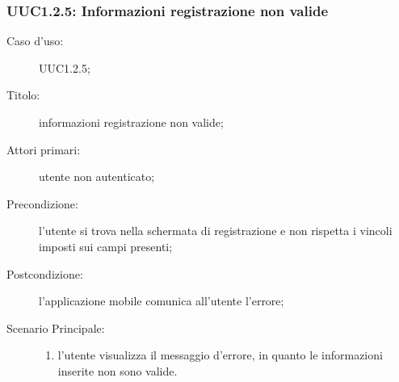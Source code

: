 \documentclass[../../../analisi-dei-requisiti.tex]{subfiles}
\begin{document}
\subsubsection{UUC1.2.5: Informazioni registrazione non valide}%
\label{subs:UUC1.2.5}
\begin{description}
  \item[Caso d’uso:] UUC1.2.5;
  \item[Titolo:] informazioni registrazione non valide;
  \item[Attori primari:] utente non autenticato;
  \item[Precondizione:] l'utente si trova nella schermata di registrazione e non rispetta i vincoli imposti sui campi presenti;
  \item[Postcondizione:] l'applicazione mobile comunica all'utente l'errore;
  \item[Scenario Principale:]
        \begin{enumerate}
          \item l'utente visualizza il messaggio d'errore, in quanto le informazioni inserite non sono valide.
        \end{enumerate}
\end{description}
\end{document}
